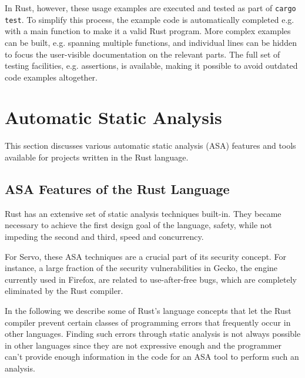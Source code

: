 \documentclass{scrartcl}
\begin{document}
In Rust, however, these usage examples are executed and tested as part of \texttt{cargo test}. To simplify this process, the example code is automatically completed e.g. with a main function to make it a valid Rust program. More complex examples can be built, e.g. spanning multiple functions, and individual lines can be hidden to focus the user-visible documentation on the relevant parts. The full set of testing facilities, e.g. assertions, is available, making it possible to avoid outdated code examples altogether.


\newpage


\section{Automatic Static Analysis}

This section discusses various automatic static analysis (ASA) features and tools available for projects written in the Rust language.

\subsection{ASA Features of the Rust Language} \label{rust_features}

Rust has an extensive set of static analysis techniques built-in. They became necessary to achieve the first design goal of the language, safety, while not impeding the second and third, speed and concurrency.

For Servo, these ASA techniques are a crucial part of its security concept. For instance, a large fraction of the security vulnerabilities in Gecko, the engine currently used in Firefox, are related to use-after-free bugs, which are completely eliminated by the Rust compiler.

In the following we describe some of Rust's language concepts that let the Rust compiler prevent certain classes of programming errors that frequently occur in other languages. Finding such errors through static analysis is not always possible in other languages since they are not expressive enough and the programmer can't provide enough information in the code for an ASA tool to perform such an analysis.
\end{document}
